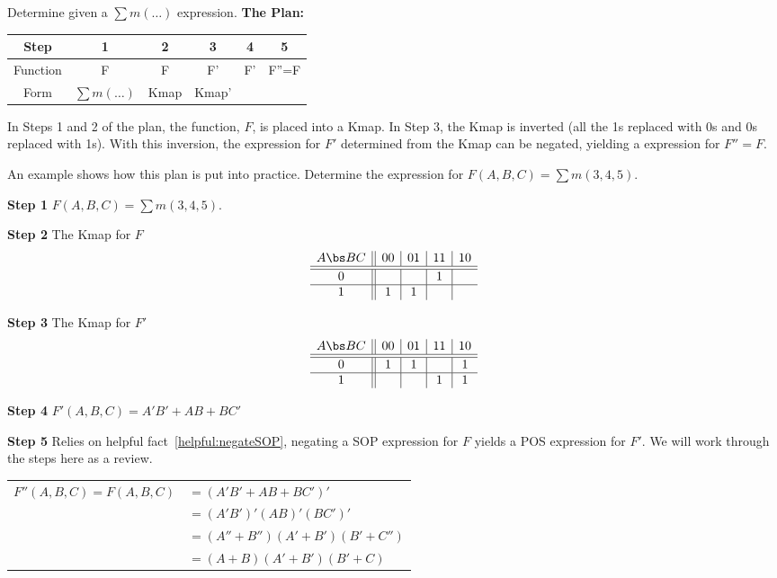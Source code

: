 \begin{process}{Determine \POSmin given a $\sum m(\ldots)$ expression.}
\label{process:minimizationSumToPOS}
\textbf{The Plan:}

\begin{tabular}{|c|c|c|c|c|c|}\hline
Step	  & 1  & 2  & 3  & 4  & 5   \\ \hline
Function  & F  & F  & F' & F' & F''=F \\ \hline
Form	  & $\sum m(\ldots)$ & Kmap & Kmap' & \SOPmin & \POSmin \\ \hline
\end{tabular}
\vspace{0.2cm}

In Steps 1 and 2 of the plan, the function, $F$, is placed into a Kmap.
In Step 3, the Kmap is inverted (all the 1s replaced with 0s and 
0s replaced with 1s).  With this inversion, the 
\SOPmin expression for $F'$ determined from the Kmap 
can be negated, yielding a \POSmin expression for $F''=F$.  

An example shows how this plan is put into practice.
Determine the \POSmin expression for $F(A,B,C) = \sum m(3,4,5)$.

\textbf{Step 1} $F(A,B,C) = \sum m(3,4,5)$.

\textbf{Step 2} The Kmap for $F$ 
$$ \begin{array} {c||c|c|c|c}
        A \bs BC & 00 & 01 & 11 & 10 \\ \hline \hline
        0        &    &    & 1  &    \\ \hline
        1        & 1  & 1  &    &    \\ 
\end{array} $$

\textbf{Step 3} The Kmap for $F'$ 
$$ \begin{array} {c||c|c|c|c}
        A \bs BC & 00 & 01 & 11 & 10 \\ \hline \hline
        0        & 1  & 1  &    & 1  \\ \hline
        1        &    &    & 1  & 1  \\ 
\end{array} $$

\textbf{Step 4} $F'(A,B,C)= A'B'+AB+BC'$  

\textbf{Step 5} Relies on helpful fact~\ref{helpful:negateSOP},
negating a SOP expression for $F$ yields a POS expression
for $F'$.  We will work through the steps here as a review.

\begin{tabular}[ht]{ll}
$F''(A,B,C) = F(A,B,C)$		& 	$= (A'B'+AB+BC')'$			\\
							&	$= (A'B')'(AB)'(BC')'		$		\\
							&	$= (A'' + B'')(A' + B')(B' + C'')$		\\
							&	$= (A+B)(A'+B')(B'+C) $			\\
\end{tabular}
\end{process}

